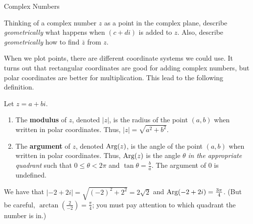 \begin{section}{Complex Numbers}
\begin{problem}
Thinking of a complex number $z$ as a point in the complex plane, describe \emph{geometrically} what happens when $(c+di)$ is added to $z$. Also, describe \emph{geometrically}  how to find $\overline{z}$ from $z$.
\end{problem}

When we plot points, there are different coordinate systems we could use. It turns out that  rectangular coordinates are good for adding complex numbers, but polar coordinates are better for multiplication. This lead to the following definition.

\begin{definition}
Let $z=a+bi$. 
\begin{enumerate}
\item The \textbf{modulus} of $z$, denoted $|z|$, is the radius of the point $(a,b)$ when written in polar coordinates. Thus, $|z| = \sqrt{a^2 + b^2}$. 
\item The \textbf{argument} of $z$, denoted $\operatorname{Arg}(z)$, is the angle of the point $(a,b)$ when written in polar coordinates. Thus, $\operatorname{Arg}(z)$ is the angle $\theta$ \emph{in the appropriate quadrant} such that $0\le \theta<2\pi$ and $\tan \theta = \frac{b}{a}$. The argument of  $0$ is undefined.
\end{enumerate}
\end{definition}

\begin{example}
We have that $|-2 + 2i| = \sqrt{(-2)^2+2^2} = 2\sqrt{2}$ and $\operatorname{Arg}(-2 + 2i) = \frac{3\pi}{4}$. (But be careful, $\arctan\left(\frac{2}{-2}\right) = \frac{\pi}{4}$; you must pay attention to which quadrant the number is in.)
\begin{center}
\end{center}
\end{example}
\end{section}

